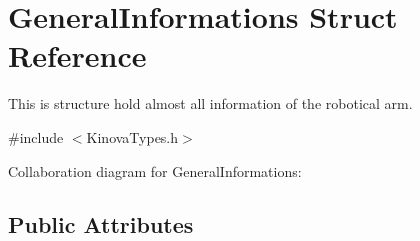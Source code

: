 \hypertarget{struct_general_informations}{}\section{General\+Informations Struct Reference}
\label{struct_general_informations}


This is structure hold almost all information of the robotical arm.  




{\ttfamily \#include $<$Kinova\+Types.\+h$>$}



Collaboration diagram for General\+Informations\+:
\subsection*{Public Attributes}
